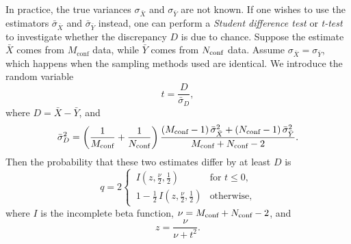 In practice, the true variances $\sigma_{\bar{X}}$ and $\sigma_{\bar{Y}}$
are not known. If one wishes to use the estimators $\bar{\sigma}_{\bar{X}}$
and $\bar{\sigma}_{\bar{Y}}$ instead, one can perform a {\it Student
difference test} or {\it t-test} to investigate whether the 
discrepancy $D$ is due to chance. Suppose the estimate $\bar{X}$ comes from 
$M_{\text{conf}}$ data, while $\bar{Y}$ comes from $N_{\text{conf}}$ data.
Assume $\sigma_{\bar{X}}=\sigma_{\bar{Y}}$, which
happens when the sampling methods used are identical.
We introduce the random variable
\begin{equation}
  t=\frac{D}{\bar{\sigma}_D},
\end{equation}
where $D=\bar{X}-\bar{Y}$, and
\begin{equation}
  \bar{\sigma}^2_D=\left(\frac{1}{M_{\text{conf}}}+\frac{1}{N_{\text{conf}}}\right)
                   \frac{(M_{\text{conf}}-1)\,\bar{\sigma}_{\bar{X}}^2
                    +(N_{\text{conf}}-1)\,\bar{\sigma}_{\bar{Y}}^2}
                   {M_{\text{conf}}+N_{\text{conf}}-2}.
\end{equation}
Then the probability that these two estimates differ by at least $D$ is
\begin{equation}
 q=2
 \begin{cases}
 \,I\left(z,\frac{\nu}{2},\frac{1}{2}\right) & \text{for }t\leq 0, \\
 \,1-\frac{1}{2}\,I\left(z,\frac{\nu}{2},\frac{1}{2}\right) & \text{otherwise},
 \end{cases}
\end{equation}
where $I$ is the incomplete beta function, $\nu=M_{\text{conf}}+N_{\text{conf}}-2$,
and
\begin{equation}
  z=\frac{\nu}{\nu+t^2}.
\end{equation}

